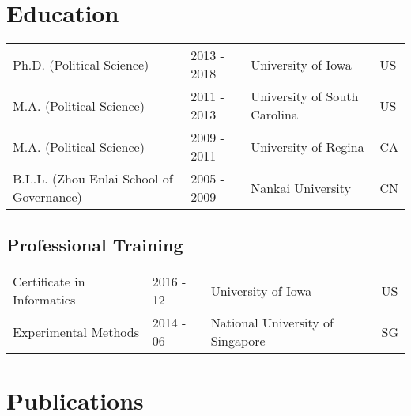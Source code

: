 \documentclass[
  12pt,
]
{article}
\begin{document}
\hypertarget{education}{%
\section{Education}\label{education}}

\begin{table}[!h]
\centering
\begin{tabular}{llll}

Ph.D. (Political Science) & 2013 - 2018 & University of Iowa & US\\
M.A. (Political Science) & 2011 - 2013 & University of South Carolina & US\\
M.A. (Political Science) & 2009 - 2011 & University of Regina & CA\\
B.L.L. (Zhou Enlai School of Governance) & 2005 - 2009 & Nankai University & CN\\

\end{tabular}
\end{table}

\hypertarget{professional-training}{%
\subsection{Professional Training}\label{professional-training}}

\begin{table}[!h]
\centering
\begin{tabular}{llll}

Certificate in Informatics & 2016 - 12 & University of Iowa & US\\
Experimental Methods & 2014 - 06 & National University of Singapore & SG\\

\end{tabular}
\end{table}

\hypertarget{publications}{%
\section{Publications}\label{publications}}
\end{document}
